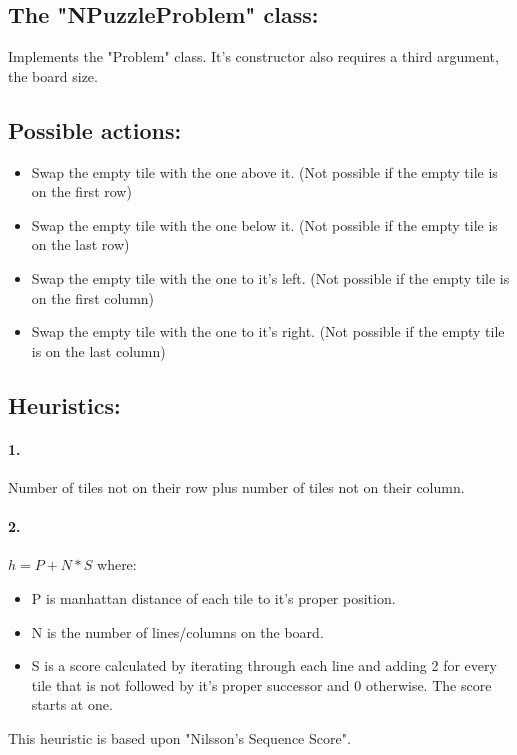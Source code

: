 \documentclass[a4paper, 12pt]{article}
\begin{document}
\subsection*{The "NPuzzleProblem" class:}
Implements the "Problem" class. It's constructor also requires a third argument, the board size.

\subsection*{Possible actions:}
\begin{itemize}
    \item Swap the empty tile with the one above it. (Not possible if the empty tile is on the
    first row)
    \item Swap the empty tile with the one below it. (Not possible if the empty tile is on the 
    last row)
    \item Swap the empty tile with the one to it's left. (Not possible if the empty tile is on
    the first column)
    \item Swap the empty tile with the one to it's right. (Not possible if the empty tile is on
    the last column)
\end{itemize}

\subsection*{Heuristics:}
\paragraph{1.}
Number of tiles not on their row plus number of tiles not on their column.

\paragraph{2.}
$h = P + N * S$ where:
\begin{itemize}
    \item P is manhattan distance of each tile to it's proper position.
    \item N is the number of lines/columns on the board.
    \item S is a score calculated by iterating through each line and adding 2
    for every tile that is not followed by it's proper successor and 0 otherwise.
    The score starts at one.
\end{itemize}
This heuristic is based upon "Nilsson's Sequence Score".
\end{document}
